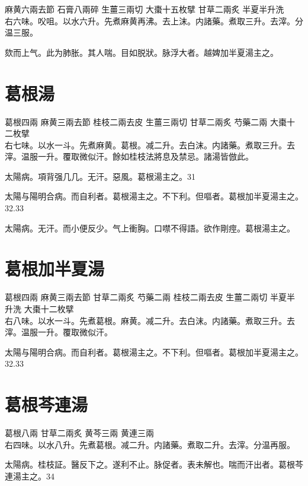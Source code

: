 麻黄{\scriptsize 六兩去節} 石膏{\scriptsize 八兩碎} 生薑{\scriptsize 三兩切} 大棗{\scriptsize 十五枚擘} 甘草{\scriptsize 二兩炙} 半夏{\scriptsize 半升洗}\\
右六味。㕮咀。以水六升。先煮麻黄再沸。去上沫。内諸藥。煮取三升。去滓。分温三服。

欬而上气。此为肺胀。其人喘。目如脱狀。脉浮大者。越婢加半夏湯主之。

\section{葛根湯}

葛根{\scriptsize 四兩} 麻黄{\scriptsize 三兩去節} 桂枝{\scriptsize 二兩去皮} 生薑{\scriptsize 三兩切} 甘草{\scriptsize 二兩炙} 芍藥{\scriptsize 二兩} 大棗{\scriptsize 十二枚擘}\\
右七味。以水一斗。先煮麻黄。葛根。减二升。去白沫。内諸藥。煮取三升。去滓。温服一升。覆取微似汗。餘如桂枝法將息及禁忌。諸湯皆倣此。

太陽病。項背强几几。无汗。惡風。葛根湯主之。31

太陽与陽明合病。而自利{\khaaitp 者}。葛根湯主之。不下利。但嘔者。葛根加半夏湯主之。32.33

太陽病。无汗。而小便反少。气上衝胸。口噤不得語。欲作剛痙。葛根湯主之。

\section{葛根加半夏湯}

葛根{\scriptsize 四兩} 麻黄{\scriptsize 三兩去節} 甘草{\scriptsize 二兩炙} 芍藥{\scriptsize 二兩} 桂枝{\scriptsize 二兩去皮} 生薑{\scriptsize 二兩切} 半夏{\scriptsize 半升洗} 大棗{\scriptsize 十二枚擘}\\
右八味。以水一斗。先煮葛根。麻黄。减二升。去白沫。内諸藥。煮取三升。去滓。温服一升。覆取微似汗。

太陽与陽明合病。而自利{\khaaitp 者}。葛根湯主之。不下利。但嘔者。葛根加半夏湯主之。32.33

\section{葛根芩連湯}

葛根{\scriptsize 八兩} 甘草{\scriptsize 二兩炙} 黄芩{\scriptsize 三兩} 黄連{\scriptsize 三兩}\\
右四味。以水八升。先煮葛根。减二升。内諸藥。煮取二升。去滓。分温再服。

太陽病。桂枝証。醫反下之。遂利不止。脉促者。表未解也。喘而汗出者。葛根芩連湯主之。34

